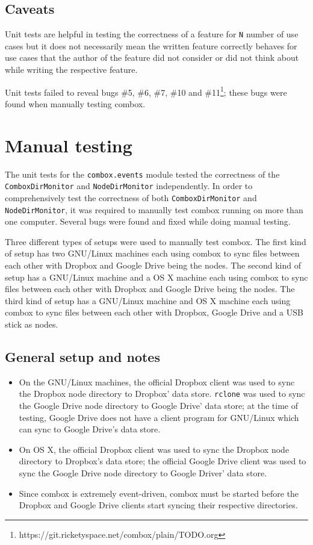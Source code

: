 \subsection{Caveats}

Unit tests are helpful in testing the correctness of a feature for
\verb+N+ number of use cases but it does not necessarily mean the
written feature correctly behaves for use cases that the author of the
feature did not consider or did not think about while writing the
respective feature.

Unit tests failed to reveal bugs \#5, \#6, \#7, \#10 and
\#11\footnote{https://git.ricketyspace.net/combox/plain/TODO.org};
these bugs were found when manually testing combox.

\section{Manual testing}\label{sec:4-manual-testing}

The unit tests for the \verb+combox.events+ module tested the
correctness of the \\ \verb+ComboxDirMonitor+ and
\verb+NodeDirMonitor+ independently. In order to comprehensively test
the correctness of both \verb+ComboxDirMonitor+ and
\verb+NodeDirMonitor+, it was required to manually test combox running
on more than one computer. Several bugs were found and fixed while
doing manual testing.

Three different types of setups were used to manually test combox. The
first kind of setup has two GNU/Linux machines each using combox to
sync files between each other with Dropbox and Google Drive being the
nodes. The second kind of setup has a GNU/Linux machine and a OS X
machine each using combox to sync files between each other with
Dropbox and Google Drive being the nodes. The third kind of setup has
a GNU/Linux machine and OS X machine each using combox to sync files
between each other with Dropbox, Google Drive and a USB stick as
nodes.

\subsection{General setup and notes}

\begin{itemize}
\item On the GNU/Linux machines, the official Dropbox client was used
  to sync the Dropbox node directory to Dropbox' data
  store. \verb+rclone+\cite{program:rclone} was used to sync the
  Google Drive node directory to Google Drive' data store; at the time
  of testing, Google Drive does not have a client program for
  GNU/Linux which can sync to Google Drive's data store.
\item On OS X, the official Dropbox client was used to sync the
  Dropbox node directory to Dropbox's data store; the official Google
  Drive client was used to sync the Google Drive node directory to
  Google Driver' data store.
\item Since combox is extremely event-driven, combox must be started
  before the Dropbox and Google Drive clients start syncing their
  respective directories.
\end{itemize}

